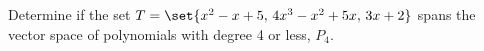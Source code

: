 Determine if the set $T=\set{x^2-x+5,\,4x^3-x^2+5x,\,3x+2}$ spans the vector space of polynomials with degree 4 or less, $P_4$.